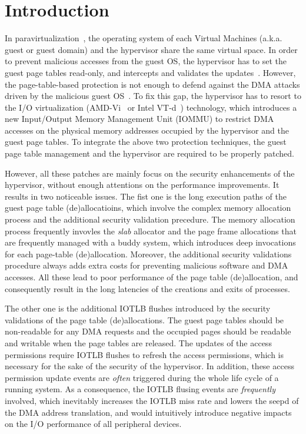 \section{Introduction} \label{sec:intro}
In paravirtualization~\cite{XEN-SOSP03,whitaker2002scale}, the operating system of each Virtual Machines (a.k.a. guest or guest domain) and the hypervisor share the same virtual space.
In order to prevent malicious accesses from the guest OS, the hypervisor has to set the guest page tables read-only, and intercepts and validates the updates~\cite{XEN-SOSP03}.
However, the page-table-based protection is not enough to defend against the DMA attacks driven by the malicious guest OS~\cite{disaggregation}.
To fix this gap, the hypervisor has to resort to the I/O virtualization (AMD-Vi~\cite{amdvt} or Intel VT-d~\cite{intelvt}) technology, which introduces a new Input/Output Memory Management Unit (IOMMU) to restrict DMA accesses on the physical memory addresses occupied by the hypervisor and the guest page tables.
To integrate the above two protection techniques, the guest page table management and the hypervisor are required to be properly patched.

However, all these patches are mainly focus on the security enhancements of the hypervisor, without enough attentions on the performance improvements.
It results in two noticeable issues.
The fist one is the long execution paths of the guest page table (de)allocatioins, which involve the complex memory allocation process and the additional security validation precedure. 
The memory allocation process frequently invovles the \emph{slab} allocator and the page frame allocations that are frequently managed with a buddy system, which introduces deep invocations for each page-table (de)allocation.
Moreover, the additional security validations procedure always adds extra costs for preventing malicious software and DMA accesses.  
All these lead to poor performance of the page table (de)allocation, and consequently result in the long latencies of the creations and exits of processes. 

The other one is the additional IOTLB flushes introduced by the security validations of the page table (de)allocations. 
The guest page tables should be non-readable for any DMA requests and the occupied pages should be readable and writable when the page tables are released. 
The updates of the access permissions require IOTLB flushes to refresh the access permissions, which is necessary for the sake of the security of the hypervisor.
In addition, these access permission update events are \emph{often} triggered during the whole life cycle of a running system.
As a consequence, the IOTLB flusing events are \emph{frequently} involved, which inevitably increases the IOTLB miss rate and lowers the seepd of the DMA address translation, and would intuitively introduce negative impacts on the I/O performance of all peripheral devices. 


